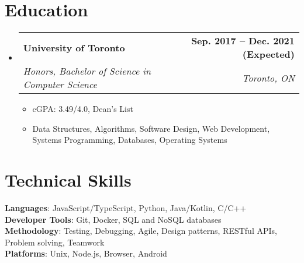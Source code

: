 \documentclass[letterpaper,11pt]{article}
\makeatletter
\newcommand{\resumeItem}[1]{
  \item\small{
    {#1 \vspace{-2pt}}
  }
}
\newcommand{\resumeSubheading}[4]{
  \vspace{-2pt}\item
    \begin{tabular*}{1.0\textwidth}[t]{l@{\extracolsep{\fill}}r}
      \textbf{#1} & \textbf{\small #2} \\
      \textit{\small#3} & \textit{\small #4} \\
    \end{tabular*}\vspace{-7pt}
}
\newcommand{\resumeSubHeadingListStart}{\begin{itemize}[leftmargin=0.0in, label={}]}
\newcommand{\resumeSubHeadingListEnd}{\end{itemize}}
\newcommand{\resumeItemListStart}{\begin{itemize}}
\newcommand{\resumeItemListEnd}{\end{itemize}\vspace{-5pt}}
\makeatother
\begin{document}
\section{Education}
\resumeSubHeadingListStart
\resumeSubheading
{University of Toronto}{Sep. 2017 -- Dec. 2021 (Expected)}
{Honors, Bachelor of Science in Computer Science}{Toronto, ON}
\resumeItemListStart
\resumeItem{cGPA: 3.49/4.0, Dean's List}
\resumeItem{Data Structures, Algorithms, Software Design, Web Development, Systems Programming, Databases, Operating Systems}
\resumeItemListEnd
\resumeSubHeadingListEnd

\section{Technical Skills}
\begin{itemize}[leftmargin=0.15in, label={}]
    \small{\item{
          \textbf{Languages}{: JavaScript/TypeScript, Python, Java/Kotlin, C/C++} \\
          \textbf{Developer Tools}{: Git, Docker, SQL and NoSQL databases} \\
          \textbf{Methodology}{: Testing, Debugging, Agile, Design patterns, RESTful APIs, Problem solving, Teamwork} \\
          \textbf{Platforms}{: Unix, Node.js, Browser, Android} \\
          }}
\end{itemize}
\vspace{-16pt}
\end{document}
